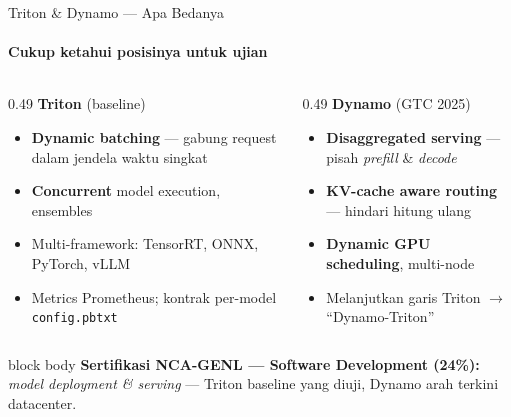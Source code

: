 \documentclass[aspectratio=169,t]{beamer}
\newcommand{\certnote}[2]{%
  \vspace{0.25em}
  \begin{beamercolorbox}[rounded=true,shadow=false,sep=5pt]{block body}
    {\scriptsize\color{nvblue}\textbf{Sertifikasi NCA-GENL --- #1:}}\,
    {\scriptsize\color{nvgray}#2}
  \end{beamercolorbox}%
}
\begin{document}
\begin{frame}{Triton \& Dynamo --- Apa Bedanya}
  \framesubtitle{Cukup ketahui posisinya untuk ujian}
  \begin{columns}[T]
    \begin{column}{0.49\textwidth}
      \textcolor{nvgreen}{\textbf{Triton} (baseline)}
      \begin{itemize}\footnotesize
        \item \textbf{Dynamic batching} --- gabung request dalam jendela waktu singkat
        \item \textbf{Concurrent} model execution, ensembles
        \item Multi-framework: TensorRT, ONNX, PyTorch, vLLM
        \item Metrics Prometheus; kontrak per-model \texttt{config.pbtxt}
      \end{itemize}
    \end{column}
    \begin{column}{0.49\textwidth}
      \textcolor{nvblue}{\textbf{Dynamo} (GTC 2025)}
      \begin{itemize}\footnotesize
        \item \textbf{Disaggregated serving} --- pisah \emph{prefill} \& \emph{decode}
        \item \textbf{KV-cache aware routing} --- hindari hitung ulang
        \item \textbf{Dynamic GPU scheduling}, multi-node
        \item Melanjutkan garis Triton $\to$ ``Dynamo-Triton''
      \end{itemize}
    \end{column}
  \end{columns}
  \certnote{Software Development (24\%)}{\emph{model deployment \& serving} --- Triton baseline yang diuji, Dynamo arah terkini datacenter.}
\end{frame}
\end{document}

